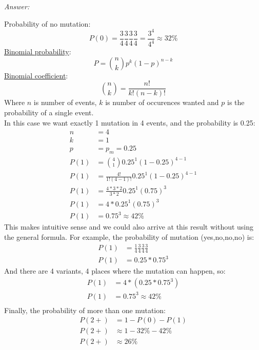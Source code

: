\textit{Answer:}

Probability of no mutation:
\begin{equation*}
    P(0) = \frac{3}{4} \frac{3}{4} \frac{3}{4} \frac{3}{4} = \frac{3^4}{4^4} \approx 32\%
\end{equation*}
\href{https://en.wikipedia.org/wiki/Binomial_distribution}{Binomial probability}:
\begin{equation}
    P = {n \choose k} p^k (1-p)^{n-k}
\end{equation}
\href{https://en.wikipedia.org/wiki/Binomial_coefficient}{Binomial coefficient}:
\begin{equation}
    {n \choose k} = \frac{n!}{k!(n-k)!}
\end{equation}
Where \(n\) is number of events,
\(k\) is number of occurences wanted and \(p\) is the probability of a single event.\\

In this case we want exactly 1 mutation in 4 events, and the probability is 0.25:
\begin{align*}
    n &= 4\\
    k &= 1\\
    p &= p_m = 0.25\\
    P(1) &= {4 \choose 1} 0.25^1 (1-0.25)^{4-1}\\
    P(1) &= \frac{4!}{1!(4-1)!} 0.25^1 (1-0.25)^{4-1}\\
    P(1) &= \frac{4*3*2}{3*2} 0.25^1 (0.75)^{3}\\
    P(1) &= 4 * 0.25^1 (0.75)^{3}\\
    P(1) &= 0.75^3 \approx 42\%
\end{align*}
This makes intuitive sense and we could also arrive at this result without using the general formula.
For example, the probability of mutation (yes,no,no,no) is:
\begin{align*}
    P(1) &= \frac{1}{4} \frac{3}{4} \frac{3}{4} \frac{3}{4}\\
    P(1) &= 0.25 * 0.75^3
\end{align*}
And there are 4 variants, 4 places where the mutation can happen, so:
\begin{align*}
    P(1) &= 4 * (0.25 * 0.75^3)\\
    P(1) &= 0.75^3 \approx 42\%\\
\end{align*}
Finally, the probability of more than one mutation:
\begin{align*}
    P(2+) &= 1 - P(0) - P(1)\\
    P(2+) &\approx 1 - 32\% - 42\%\\
    P(2+) &\approx 26\%
\end{align*}

